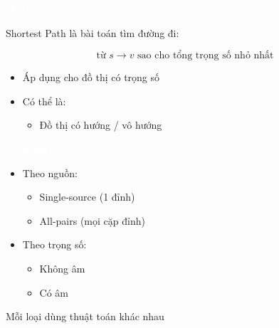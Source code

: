 \documentclass{beamer}
\title{\hlred{Shortest Path - Tổng quan}}
\author{Group 3}
\date{\hlcyan{03/2026}}
\newcommand{\hlblue}[1]{\textcolor{myblue}{#1}}
\newcommand{\hlgreen}[1]{\textcolor{mygreen}{#1}}
\newcommand{\hlred}[1]{\textcolor{myred}{#1}}
\newcommand{\hlpurple}[1]{\textcolor{mypurple}{#1}}
\newcommand{\hlcyan}[1]{\textcolor{mycyan}{#1}}
\newcommand{\hlwhite}[1]{\textcolor{white}{#1}}
\begin{document}
\frame{\titlepage}


\begin{frame}{\hlwhite{Định nghĩa}}
\begin{tcolorbox}[title=\textbf{\hlwhite{Khái niệm}}]
\hlblue{Shortest Path} là bài toán tìm đường đi:

\[
\text{từ } s \rightarrow v \text{ sao cho tổng trọng số nhỏ nhất}
\]
\end{tcolorbox}

\begin{itemize}
\item Áp dụng cho \hlred{đồ thị có trọng số}
\item Có thể là:
\begin{itemize}
\item Đồ thị có hướng / vô hướng
\end{itemize}
\end{itemize}
\end{frame}


\begin{frame}{\hlwhite{Phân loại}}
\begin{itemize}
\item Theo nguồn:
\begin{itemize}
\item \hlblue{Single-source} (1 đỉnh)
\item \hlgreen{All-pairs} (mọi cặp đỉnh)
\end{itemize}

\item Theo trọng số:
\begin{itemize}
\item \hlpurple{Không âm}
\item \hlred{Có âm}
\end{itemize}
\end{itemize}

\begin{tcolorbox}
\centering
\hlcyan{Mỗi loại dùng thuật toán khác nhau}
\end{tcolorbox}
\end{frame}

\end{document}
